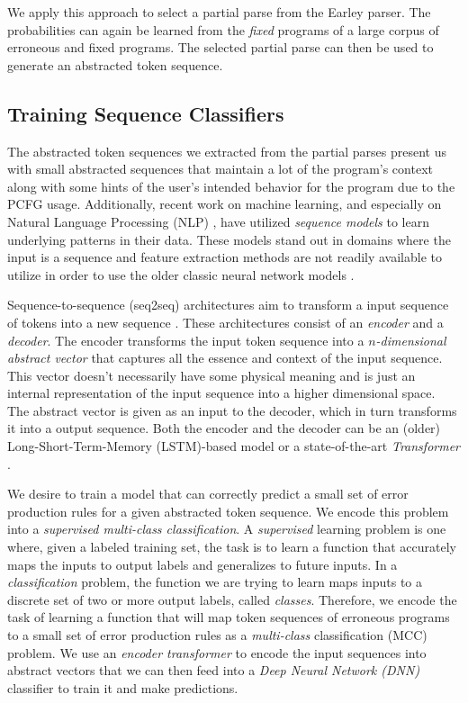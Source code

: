 We apply this approach to select a partial parse from the Earley parser. The
probabilities can again be learned from the \emph{fixed} programs of a large
corpus of erroneous and fixed programs. The selected partial parse can then be
used to generate an abstracted token sequence.


\subsection{Training Sequence Classifiers}
\label{sec:overview:train}
The abstracted token sequences we extracted from the partial parses present us
with small abstracted sequences that maintain a lot of the program's context
along with some hints of the user's intended behavior for the program due to the
PCFG usage. Additionally, recent work on machine learning, and especially on
Natural Language Processing (NLP) \citep{Sutskever_2014, Hardalov_2018}, have
utilized \emph{sequence models} to learn underlying patterns in their data.
These models stand out in domains where the input is a sequence and feature
extraction methods are not readily available to utilize in order to use the
older classic neural network models \citep{Sutskever_2014}.

 Sequence-to-sequence (seq2seq) architectures aim to
transform a input sequence of tokens into a new sequence \citep{Sutskever_2014}.
These architectures consist of an \emph{encoder} and a \emph{decoder}. The
encoder transforms the input token sequence into a \emph{$n$-dimensional
abstract vector} that captures all the essence and context of the input
sequence. This vector doesn't necessarily have some physical meaning and is just
an internal representation of the input sequence into a higher dimensional
space. The abstract vector is given as an input to the decoder, which in turn
transforms it into a output sequence. Both the encoder and the decoder can be an
(older) Long-Short-Term-Memory (LSTM)-based model \citep{Hochreiter_1997} or a
state-of-the-art \emph{Transformer} \citep{Vaswani_2017}.

 We desire to train a model that can correctly
predict a small set of error production rules for a given abstracted token
sequence. We encode this problem into a \emph{supervised multi-class
classification}. A \emph{supervised} learning problem is one where, given a
labeled training set, the task is to learn a function that accurately maps the
inputs to output labels and generalizes to future inputs. In a
\emph{classification} problem, the function we are trying to learn maps inputs
to a discrete set of two or more output labels, called \emph{classes}.
Therefore, we encode the task of learning a function that will map token
sequences of erroneous programs to a small set of error production rules as a
\emph{multi-class} classification (MCC) problem. We use an \emph{encoder
transformer} to encode the input sequences into abstract vectors that we can
then feed into a \emph{Deep Neural Network (DNN)} classifier to train it and
make predictions.

